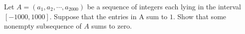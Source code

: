 Let $A = (a_1, a_2, \cdots ,a_{2000})$ be a sequence of integers each lying in the interval $[-1000,1000]$. Suppose that the entries in A sum to $1$. Show that some nonempty subsequence of $A$ sums to zero.